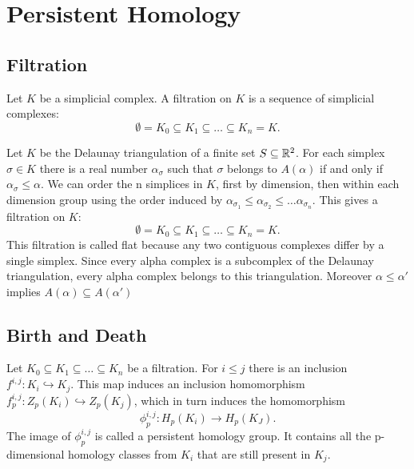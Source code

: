 \section{Persistent Homology}


\subsection{Filtration}

\begin{definition}
    Let $K$ be a simplicial complex. A filtration on $K$ is a sequence of simplicial complexes:
    $$
    \emptyset = K_0 \subseteq K_1 \subseteq \ldots \subseteq K_n = K.
    $$
\end{definition}

\begin{example}
    Let $K$ be the Delaunay triangulation of a finite set $S \subseteq \mathbb{R}^2$. For each simplex $\sigma \in K$ there is a real number $\alpha_\sigma$ such that $\sigma$ belongs to $A(\alpha)$ if and only if $\alpha_\sigma \leq \alpha$. We can order the n simplices in $K$, first by dimension, then within each dimension group using the order induced by $\alpha_{\sigma_1} \leq \alpha_{\sigma_2} \leq \ldots \alpha_{\sigma_n}$. This gives a filtration on $K$:
    $$
    \emptyset = K_0 \subseteq K_1 \subseteq \ldots \subseteq K_n = K.
    $$
    This filtration is called flat because any two contiguous complexes differ by a single simplex. Since every alpha complex is a subcomplex of the Delaunay triangulation, every alpha complex belongs to this triangulation. Moreover $\alpha \leq \alpha'$ implies $A(\alpha) \subseteq A(\alpha')$
\end{example}


\subsection{Birth and Death}

Let $K_0 \subseteq K_1 \subseteq \ldots \subseteq K_n$ be a filtration. For $i \leq j$ there is an inclusion $f^{i, j}: K_i \hookrightarrow K_j$. This map induces an inclusion homomorphism $f_p^{i, j}: Z_p(K_i) \hookrightarrow Z_p(K_j)$, which in turn induces the homomorphism 
$$
\phi_p^{i, j}: H_p(K_i) \rightarrow H_p(K_J).
$$
The image of $\phi_p^{i, j}$ is called a persistent homology group. It contains all the p-dimensional homology classes from $K_i$ that are still present in $K_j$. 

